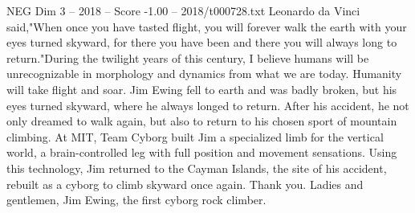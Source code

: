 \begin{textsample}{NEG Dim 3 – 2018 – Score -1.00 – 2018/t000728.txt}
Leonardo da Vinci said,"When once you have tasted flight, you will forever walk the earth with your eyes turned skyward, for there you have been and there you will always long to return."During the twilight years of this century, I believe humans will be unrecognizable in morphology and dynamics from what we are today.
Humanity will take flight and soar.
Jim Ewing fell to earth and was badly broken, but his eyes turned skyward, where he always longed to return.
After his accident, he not only dreamed to walk again, but also to return to his chosen sport of mountain climbing.
At MIT, Team Cyborg built Jim a specialized limb for the vertical world, a brain-controlled leg with full position and movement sensations.
Using this technology, Jim returned to the Cayman Islands, the site of his accident, rebuilt as a cyborg to climb skyward once again.
Thank you.
Ladies and gentlemen, Jim Ewing, the first cyborg rock climber.

\end{textsample}
